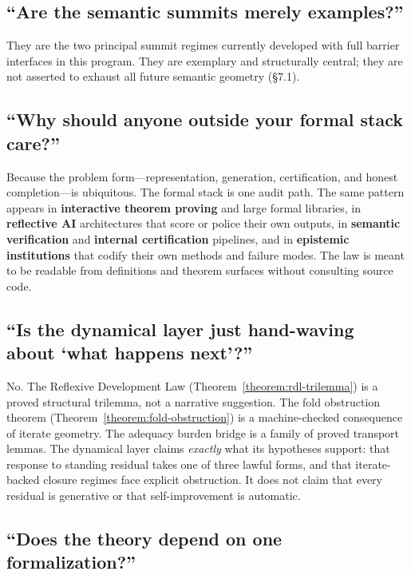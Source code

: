 \documentclass[11pt]{article}
\theoremstyle{plain}
\theoremstyle{definition}
\theoremstyle{remark}
\begin{document}
\subsection{``Are the semantic summits merely examples?''}

They are the two principal summit regimes currently developed with full barrier interfaces in this program. They are exemplary and structurally central; they are not asserted to exhaust all future semantic geometry (\S7.1).

\subsection{``Why should anyone outside your formal stack care?''}

Because the problem form---representation, generation, certification, and honest completion---is ubiquitous. The formal stack is one audit path. The same pattern appears in \textbf{interactive theorem proving} and large formal libraries, in \textbf{reflective AI} architectures that score or police their own outputs, in \textbf{semantic verification} and \textbf{internal certification} pipelines, and in \textbf{epistemic institutions} that codify their own methods and failure modes. The law is meant to be readable from definitions and theorem surfaces without consulting source code.

\subsection{``Is the dynamical layer just hand-waving about `what happens next'?''}

No. The Reflexive Development Law (Theorem~\ref{theorem:rdl-trilemma}) is a proved structural trilemma, not a narrative suggestion. The fold obstruction theorem (Theorem~\ref{theorem:fold-obstruction}) is a machine-checked consequence of iterate geometry. The adequacy burden bridge is a family of proved transport lemmas. The dynamical layer claims \emph{exactly} what its hypotheses support: that response to standing residual takes one of three lawful forms, and that iterate-backed closure regimes face explicit obstruction. It does not claim that every residual is generative or that self-improvement is automatic.

\subsection{``Does the theory depend on one formalization?''}
\end{document}
